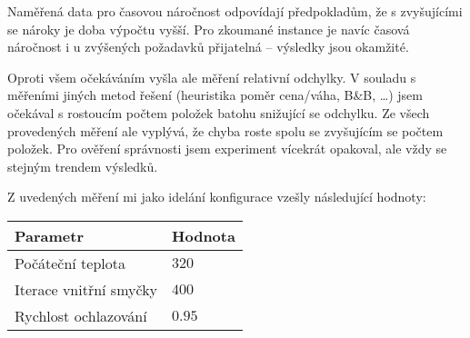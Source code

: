 \documentclass[czech]{article}
\begin{document}
Naměřená data pro časovou náročnost odpovídají předpokladům, že s zvyšujícími se nároky je doba výpočtu vyšší.
Pro zkoumané instance je navíc časová náročnost i u zvýšených požadavků přijatelná -- výsledky jsou okamžité.

Oproti všem očekáváním vyšla ale měření relativní odchylky.
V souladu s měřeními jiných metod řešení (heuristika poměr cena/váha, B\&B, \dots) jsem očekával s rostoucím počtem položek batohu snižující se odchylku.
Ze všech provedených měření ale vyplývá, že chyba roste spolu se zvyšujícím se počtem položek.
Pro ověření správnosti jsem experiment vícekrát opakoval, ale vždy se stejným trendem výsledků.

Z uvedených měření mi jako idelání konfigurace vzešly následující hodnoty: \\


\begin{tabular}{ | l | l | }
    \hline
    Parametr & Hodnota \\ \hline \hline
    Počáteční teplota & $320$ \\
    Iterace vnitřní smyčky & $400$ \\
    Rychlost ochlazování & $0.95$ \\ \hline
\end{tabular}
\end{document}
